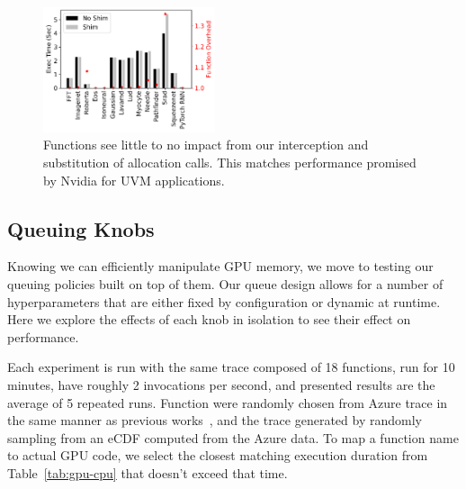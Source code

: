 \begin{figure}
  \includegraphics[width=0.45\textwidth]{../graphs/driver-compare/8-exec_time.pdf}
  \vspace*{\captionspace}
  \caption{Functions see little to no impact from our interception and substitution of allocation calls.
          This matches performance promised by Nvidia for UVM applications.}
    \label{fig:shim-overhead}
    \vspace{\myfigspace}
\end{figure}

\subsection{Queuing Knobs}
\label{sec:queue-knobs}

Knowing we can efficiently manipulate GPU memory, we move to testing our queuing policies built on top of them.
Our queue design allows for a number of hyperparameters that are either fixed by configuration or dynamic at runtime.
Here we explore the effects of each knob in isolation to see their effect on performance.

Each experiment is run with the same trace composed of 18 functions, run for 10 minutes, have roughly 2 invocations per second, and presented results are the average of 5  repeated runs.
Function were randomly chosen from Azure trace in the same manner as previous works~\cite{fuerst2023iluvatar,faaslb-hpdc22}, and the trace generated by randomly sampling from an eCDF computed from the Azure data.
To map a function name to actual GPU code, we select the closest matching execution duration from Table~\ref{tab:gpu-cpu} that doesn't exceed that time.


